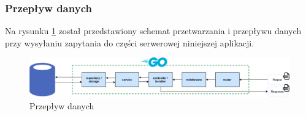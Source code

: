 \subsubsection{Przepływ danych}
Na rysunku \ref{fig:backend_data_flow} został przedstawiony schemat przetwarzania i przepływu danych przy wysyłaniu zapytania do części serwerowej niniejszej aplikacji.
\begin{figure}[ht]
\centering
\includegraphics[width=0.9\linewidth]{rys03/backend_data_flow.png}
\caption{Przepływ danych}
\label{fig:backend_data_flow}
\end{figure}

